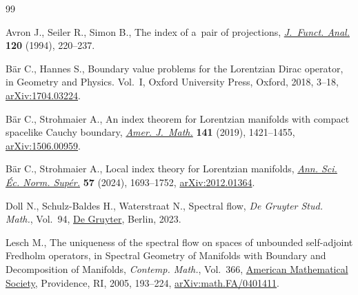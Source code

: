 \documentclass[pdftex]{sigma}
\numberwithin{equation}{section}
\begin{document}
\begin{thebibliography}{99}
\footnotesize\itemsep=0pt

Avron J., Seiler R., Simon B., The index of a~pair of projections,
  \href{https://doi.org/10.1006/jfan.1994.1031}{\textit{J.~Funct. Anal.}}
  \textbf{120} (1994), 220--237.

B\"ar C., Hannes S., Boundary value problems for the {L}orentzian {D}irac
  operator, in Geometry and Physics. {V}ol.~{I}, Oxford University Press,
  Oxford, 2018, 3--18,
  \href{http://arxiv.org/abs/1704.03224}{arXiv:1704.03224}.

B\"ar C., Strohmaier A., An index theorem for {L}orentzian manifolds with
  compact spacelike {C}auchy boundary,
  \href{https://doi.org/10.1353/ajm.2019.0037}{\textit{Amer. J.~Math.}}
  \textbf{141} (2019), 1421--1455,
  \href{http://arxiv.org/abs/1506.00959}{arXiv:1506.00959}.

B\"ar C., Strohmaier A., Local index theory for {L}orentzian manifolds,
  \href{https://doi.org/10.24033/asens.2597}{\textit{Ann. Sci. \'Ec. Norm.
  Sup\'er.}} \textbf{57} (2024), 1693--1752,
  \href{http://arxiv.org/abs/2012.01364}{arXiv:2012.01364}.

Doll N., Schulz-Baldes H., Waterstraat N., Spectral flow, \textit{De Gruyter
  Stud. Math.}, Vol.~94, \href{https://doi.org/10.1515/9783111172477}{De
  Gruyter}, Berlin, 2023.

Lesch M., The uniqueness of the spectral flow on spaces of unbounded
  self-adjoint {F}redholm operators, in Spectral Geometry of Manifolds with
  Boundary and Decomposition of Manifolds, \textit{Contemp. Math.}, Vol.~366,
  \href{https://doi.org/10.1090/conm/366/06730}{American Mathematical Society},
  Providence, RI, 2005, 193--224,
  \href{http://arxiv.org/abs/math.FA/0401411}{arXiv:math.FA/0401411}.

\end{thebibliography}\LastPageEnding
\end{document}
